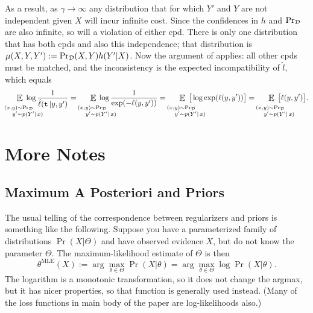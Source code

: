 \documentclass[twoside]{article}
\theoremstyle{plain}
\theoremstyle{definition}
\DeclareMathOperator*{\Ex}{\mathbb{E}} %
\newcommand{\datadist}[1]{\Pr\nolimits_{#1}}
\begin{document}
{As a result, as $\gamma\to\infty$ any distribution that for which  $Y'$ and $Y$ are not independent given $X$ will incur infinite cost. Since the confidences in $h$ and $\datadist\xysamp$ are also infinite, so will a violation of either cpd.
There is only one distribution that has both cpds and also this independence; that distribution is $\mu(X,Y,Y') := \datadist\xysamp(X,Y)h(Y'|X)$.
Now the argument of  applies: all other cpds must be matched, and the inconsistency is the expected incompatibility of $\hat l$, which equals
\[ \quad\;\;\mathop{\scalebox{1.2}{$\Ex$}}\limits_{\substack{%
	\vphantom{x}\\
	\mathllap{(x,y)} \sim \mathrlap{\datadist\xysamp} \\
	\mathllap{y'} \sim \mathrlap{p(Y'|\,x)}} }
 \; \log\frac{1}{\hat\ell(\trut\,|y,y')}
 =
 \quad\;\;\mathop{\scalebox{1.2}{$\Ex$}}\limits_{\substack{%
 	\vphantom{x}\\
 	\mathllap{(x,y)} \sim \mathrlap{\datadist\xysamp} \\
 	\mathllap{y'} \sim \mathrlap{p(Y'|\,x)}} }
  \;  \log\frac{1}{\exp(-\ell(y,y'))}
 =
 \quad\;\;\mathop{\scalebox{1.2}{$\Ex$}}\limits_{\substack{%
 	\vphantom{x}\\
 	\mathllap{(x,y)} \sim \mathrlap{\datadist\xysamp} \\
 	\mathllap{y'} \sim \mathrlap{p(Y'|\,x)}} }
  \;\big[ \log \exp(\ell(y,y')) \big]
 =
 \quad\;\;\mathop{\scalebox{1.2}{$\Ex$}}\limits_{\substack{%
	 \vphantom{x}\\
	 \mathllap{(x,y)} \sim \mathrlap{\datadist\xysamp} \\
	 \mathllap{y'} \sim \mathrlap{p(Y'|\,x)}} }
  \;\big[\ell(y,y')\big]
 .
 \]

\section{More Notes}
\subsection{Maximum A Posteriori and Priors}

The usual telling of the correspondence between regularizers and priors is something like the following.
Suppose you have a parameterized family of distributions
$\Pr(X|\Theta)$
and have observed evidence $X$, but do not know the parameter $\Theta$.
The maximum-likelihood estimate of $\Theta$ is then
\[
	\theta^{\mathrm{MLE}}(X) := \arg\max_{\theta\in \Theta}  \Pr(X|\theta)
		= \arg\max_{\theta\in \Theta} \log \Pr(X|\theta).
\]
The logarithm is a monotonic transformation, so it does not change the argmax, but it has
nicer properties, so that function is generally used instead. (Many of the loss functions in main body of the paper are log-likelihoods also.)

}
\end{document}
